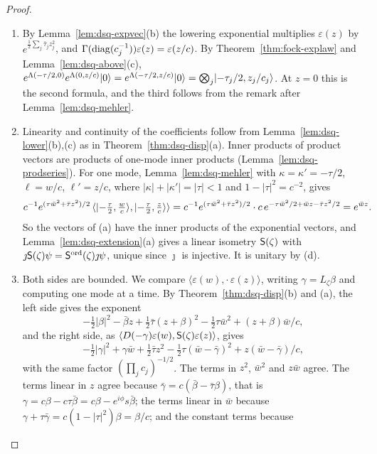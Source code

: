 \begin{veteenv}
\begin{proof}
\begin{enumerate}
\item[(a)] By Lemma~\ref{lem:dsq-expvec}(b) the lowering exponential multiplies $\varepsilon(z)$ by
$e^{\frac12\sum_j\bar\tau_jz_j^2}$, and $\Gamma(\operatorname{diag}(c_j^{-1}))\varepsilon(z)=\varepsilon(z/c)$. By Theorem~\ref{thm:fock-explaw} and
Lemma~\ref{lem:dsq-above}(c), $e^{\Lambda(-\tau/2,0)}e^{\Lambda(0,z/c)}\lvert 0\rangle=e^{\Lambda(-\tau/2,z/c)}\lvert 0\rangle=\bigotimes_j\lvert -\tau_j/2,z_j/c_j\rangle$. At
$z=0$ this is the second formula, and the third follows from the remark after Lemma~\ref{lem:dsq-mehler}.
\item[(b)] Linearity and continuity of the coefficients follow from Lemma~\ref{lem:dsq-lower}(b),(c) as in
Theorem~\ref{thm:dsq-disp}(a). Inner products of product vectors are products of one-mode inner products
(Lemma~\ref{lem:dsq-prodseries}). For one mode, Lemma~\ref{lem:dsq-mehler} with $\kappa=\kappa'=-\tau/2$, $\ell=w/c$,
$\ell'=z/c$, where $\lvert\kappa\rvert+\lvert\kappa'\rvert=\lvert\tau\rvert<1$ and $1-\lvert\tau\rvert^2=c^{-2}$, gives
\[
 c^{-1}e^{(\tau\bar w^2+\bar\tau z^2)/2}\,\langle\lvert -\tfrac\tau2,\tfrac wc\rangle,\lvert -\tfrac\tau2,\tfrac zc\rangle\rangle
 =c^{-1}e^{(\tau\bar w^2+\bar\tau z^2)/2}\cdot c\,e^{-\tau\bar w^2/2+\bar wz-\bar\tau z^2/2}=e^{\bar wz}.
\]
So the vectors of (a) have the inner products of the exponential vectors, and Lemma~\ref{lem:dsq-extension}(a) gives a
linear isometry $\mathsf S(\zeta)$ with $\jmath\mathsf S(\zeta)\psi=\mathsf S^{\mathrm{ord}}(\zeta)\jmath\psi$, unique since $\jmath$ is injective. It is unitary by (d).
\item[(c)] Both sides are bounded. We compare $\langle\varepsilon(w),\cdot\,\varepsilon(z)\rangle$, writing $\gamma=L_\zeta\beta$ and
computing one mode at a time. By Theorem~\ref{thm:dsq-disp}(b) and (a), the left side gives the exponent
\[
 -\tfrac12\lvert\beta\rvert^2-\bar\beta z+\tfrac12\bar\tau(z+\beta)^2-\tfrac12\tau\bar w^2+(z+\beta)\bar w/c,
\]
and the right side, as $\langle D(-\gamma)\varepsilon(w),\mathsf S(\zeta)\varepsilon(z)\rangle$, gives
\[
 -\tfrac12\lvert\gamma\rvert^2+\gamma\bar w+\tfrac12\bar\tau z^2-\tfrac12\tau(\bar w-\bar\gamma)^2+z(\bar w-\bar\gamma)/c ,
\]
with the same factor $(\prod_jc_j)^{-1/2}$. The terms in $z^2$, $\bar w^2$ and $z\bar w$ agree. The terms linear in $z$ agree
because $\bar\gamma=c(\bar\beta-\bar\tau\beta)$, that is $\gamma=c\beta-c\tau\bar\beta=c\beta-e^{i\phi}s\bar\beta$; the terms
linear in $\bar w$ because $\gamma+\tau\bar\gamma=c(1-\lvert\tau\rvert^2)\beta=\beta/c$; and the constant terms because

\end{enumerate}
\end{proof}
\end{veteenv}
